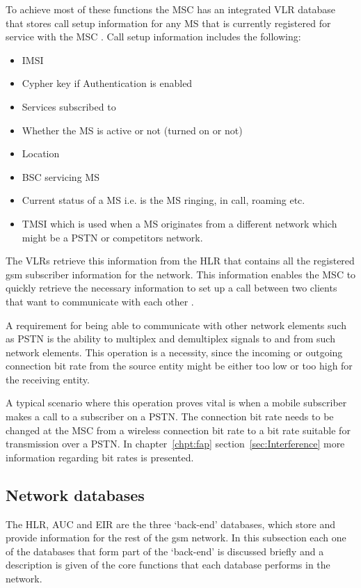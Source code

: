 To achieve most of these functions the \gls{MSC} has an integrated \gls{VLR} database that stores call setup information for any \gls{MS} that is currently registered for service with the \gls{MSC} \cite{GSM92,wirelesstelcoMullet}. Call setup information includes the following\cite{wirelesstelcoMullet}:
\begin{itemize}
    \item \gls{IMSI}
    \item Cypher key if Authentication is enabled
    \item Services subscribed to
    \item Whether the MS is active or not (turned on or not)
    \item Location
    \item BSC servicing MS
    \item Current status of a MS i.e. is the MS ringing, in call, roaming etc.
    \item \gls{TMSI} which is used when a MS originates from a different network which might be a \gls{PSTN} or competitors network.
\end{itemize}
The \glspl{VLR} retrieve this information from the \gls{HLR} that contains all the registered \gls{gsm} subscriber information for the network. This information enables the \gls{MSC} to quickly retrieve the necessary information to set up a call between two clients that want to communicate with each other \cite{GSMSysEngin,GSMSecurInTeleNetwork}.

A requirement for being able to communicate with other network elements such as \gls{PSTN} is the ability to multiplex and demultiplex signals to and from such network elements. This operation is a necessity, since the incoming or outgoing connection bit rate from the source entity might be either too low or too high for the receiving entity.

A typical scenario where this operation proves vital is when a mobile subscriber makes a call to a subscriber on a \gls{PSTN}\@. The connection bit rate needs to be changed at the \gls{MSC} from a wireless connection bit rate to a bit rate suitable for transmission over a \gls{PSTN}\@. In chapter~\ref{chpt:fap} section~\ref{sec:Interference} more information regarding bit rates is presented.

\subsection{Network databases}
The \gls{HLR},  \gls{AUC} and \gls{EIR} are the three `back-end' databases, which store and provide information for the rest of the \gls{gsm} network. In this subsection each one of the databases that form part of the `back-end' is discussed briefly and a description is given of the core functions that each database performs in the network.

